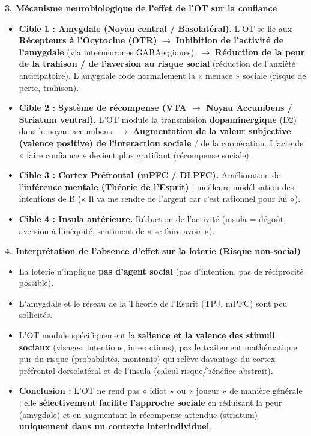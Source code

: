 \documentclass[11pt]{article}
\begin{document}
\begin{exoresolu}
\textbf{3. Mécanisme neurobiologique de l'effet de l'OT sur la confiance}
\begin{itemize}
    \item \textbf{Cible 1 : Amygdale (Noyau central / Basolatéral).} L'OT se lie aux \textbf{Récepteurs à l'Ocytocine (OTR)} $\to$ \textbf{Inhibition de l'activité de l'amygdale} (via interneurones GABAergiques). $\to$ \textbf{Réduction de la peur de la trahison / de l'aversion au risque social} (réduction de l'anxiété anticipatoire). L'amygdale code normalement la « menace » sociale (risque de perte, trahison).
    \item \textbf{Cible 2 : Système de récompense (VTA $\to$ Noyau Accumbens / Striatum ventral).} L'OT module la transmission \textbf{dopaminergique} (D2) dans le noyau accumbens. $\to$ \textbf{Augmentation de la valeur subjective (valence positive) de l'interaction sociale} / de la coopération. L'acte de « faire confiance » devient plus gratifiant (récompense sociale).
    \item \textbf{Cible 3 : Cortex Préfrontal (mPFC / DLPFC).} Amélioration de l'\textbf{inférence mentale (Théorie de l'Esprit)} : meilleure modélisation des intentions de B (« Il va me rendre de l'argent car c'est rationnel pour lui »).
    \item \textbf{Cible 4 : Insula antérieure.} Réduction de l'activité (insula = dégoût, aversion à l'inéquité, sentiment de « se faire avoir »).
\end{itemize}

\textbf{4. Interprétation de l'absence d'effet sur la loterie (Risque non-social)}
\begin{itemize}
    \item La loterie n'implique \textbf{pas d'agent social} (pas d'intention, pas de réciprocité possible).
    \item L'amygdale et le réseau de la Théorie de l'Esprit (TPJ, mPFC) sont peu sollicités.
    \item L'OT module spécifiquement la \textbf{salience et la valence des stimuli sociaux} (visages, intentions, interactions), pas le traitement mathématique pur du risque (probabilités, montants) qui relève davantage du cortex préfrontal dorsolatéral et de l'insula (calcul risque/bénéfice abstrait).
    \item \textbf{Conclusion :} L'OT ne rend pas « idiot » ou « joueur » de manière générale ; elle \textbf{sélectivement facilite l'approche sociale} en réduisant la peur (amygdale) et en augmentant la récompense attendue (striatum) \textbf{uniquement dans un contexte interindividuel}.
\end{itemize}


\end{exoresolu}
\end{document}
